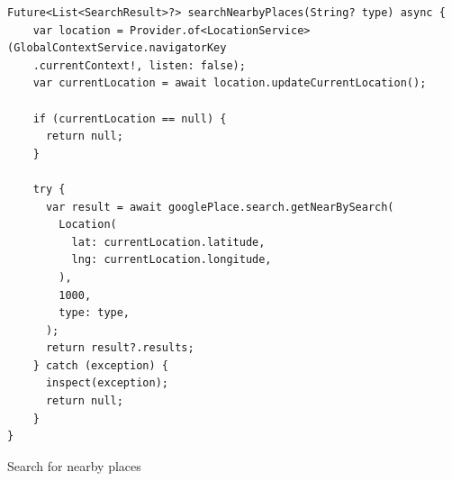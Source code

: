 \begin{code}
\begin{verbatim}
Future<List<SearchResult>?> searchNearbyPlaces(String? type) async {
    var location = Provider.of<LocationService>(GlobalContextService.navigatorKey
    .currentContext!, listen: false);
    var currentLocation = await location.updateCurrentLocation();

    if (currentLocation == null) {
      return null;
    }

    try {
      var result = await googlePlace.search.getNearBySearch(
        Location(
          lat: currentLocation.latitude,
          lng: currentLocation.longitude,
        ),
        1000,
        type: type,
      );
      return result?.results;
    } catch (exception) {
      inspect(exception);
      return null;
    }
}
\end{verbatim}
\caption{Search for nearby places}
\end{code}

